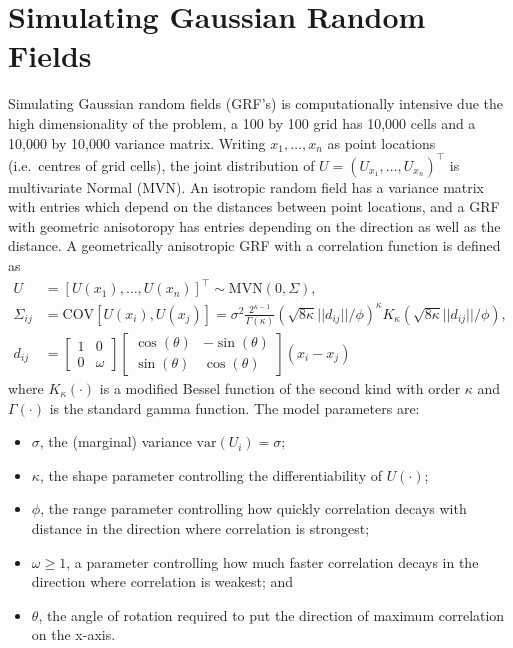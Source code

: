 \documentclass[article,nojss]{jss}\usepackage[]{graphicx}\usepackage[]{color}
\def\cov{{\text{COV}}}
\def\var{{\text{var}}}
\begin{document}
\section{Simulating Gaussian Random Fields} 

Simulating Gaussian random fields (GRF's) is computationally intensive due the high dimensionality of the problem, a 100 by 100 grid has 10,000 cells and a 10,000 by 10,000 variance matrix.  Writing $x_1,\dots, x_n$ as point locations (i.e.\ centres of grid cells), the joint distribution of $U=(U_{x_1},\dots,U_{x_n})^\top$ is multivariate Normal (MVN).  An isotropic random field has a variance matrix  with entries which depend on the distances between point locations, and a GRF with geometric anisotoropy has entries depending on the direction as well as the distance.  
A geometrically anisotropic GRF with a \citet{matern1960spatial} correlation function is defined as
\begin{align*}
U &= [U(x_1), \ldots, U(x_n)]^\top \sim \text{MVN}(0, \Sigma), \\
\Sigma_{ij} &= \cov[ U(x_i),U(x_j) ]= \sigma^2 \frac{2^{\kappa-1}}{\Gamma(\kappa)} \left(\sqrt{8\kappa} ||d_{ij}||/\phi \right)^\kappa  K_\kappa\left(\sqrt{8\kappa} ||d_{ij}||/\phi \right),\\
d_{ij} &= 
        \left[
          \begin{array}{rr}
            1 & 0 \\
            0 & \omega
          \end{array}
        \right]
        \left[
          \begin{array}{rr}
            \cos(\theta) & -\sin(\theta) \\
            \sin(\theta) & \cos(\theta)
          \end{array}
        \right]
(x_i - x_j)
\end{align*}
where $K_\kappa(\cdot)$  is a modified Bessel function of the second kind with order $\kappa$ and $\Gamma(\cdot)$ is the standard gamma function.  The model parameters are:
\begin{itemize}
\item $\sigma$, the (marginal) variance  $\var(U_i) = \sigma$;
\item $\kappa$, the shape parameter controlling the differentiability of $U(\cdot)$;
\item $\phi$, the range parameter controlling how quickly correlation decays with distance in the direction where correlation is strongest;
\item $\omega \geq 1$, a parameter controlling how much faster correlation decays in the direction where correlation is weakest; and 
\item $\theta$, the angle of rotation  required to put the direction of maximum correlation on the x-axis.
\end{itemize}
\end{document}
